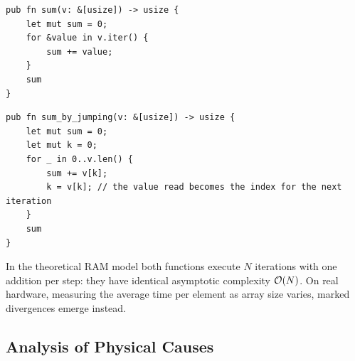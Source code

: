 \begin{lstlisting}[style=rustcode,caption={Linear sequential scan.}]
pub fn sum(v: &[usize]) -> usize {
    let mut sum = 0;
    for &value in v.iter() {
        sum += value;
    }
    sum
}
\end{lstlisting}

\begin{lstlisting}[style=rustcode,caption={Scan via random jumps (\textit{pointer chasing}).}]
pub fn sum_by_jumping(v: &[usize]) -> usize {
    let mut sum = 0;
    let mut k = 0;
    for _ in 0..v.len() {
        sum += v[k];
        k = v[k]; // the value read becomes the index for the next iteration
    }
    sum
}
\end{lstlisting}

In the theoretical RAM model both functions execute $N$ iterations with one addition per step: they have identical asymptotic complexity $\mathcal{O}\!\left(N\right)$. On real hardware, measuring the average time per element as array size varies, marked divergences emerge instead.

\begin{table}[H]
  \centering
  \small
  \caption{Average time per element for \texttt{sum()} and \texttt{sum\_by\_jumping()} as array size varies.}
  \label{tab:pointer-chasing-benchmark-en}
\end{table}

\subsection{Analysis of Physical Causes}

